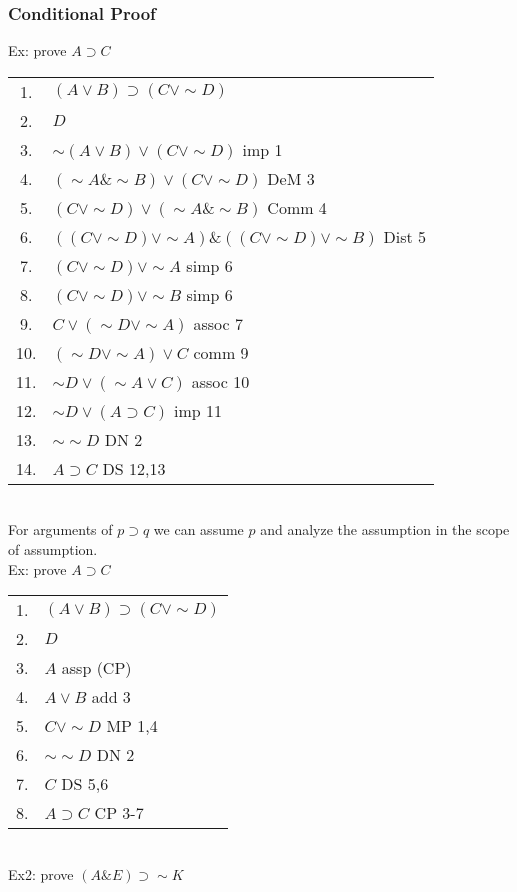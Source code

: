 \subsubsection{Conditional Proof}
Ex: prove $A\supset C$\\
\begin{tabular}{cl}
    1. & $(A\vee B)\supset(C\vee \sim D)$\\
    2. & $D$\\
    \hline
    3. & $\sim(A\vee B)\vee(C\vee \sim D)$ imp 1\\
    4. & $(\sim A\&\sim B)\vee(C\vee \sim D)$ DeM 3\\
    5. & $(C\vee \sim D)\vee(\sim A\&\sim B)$ Comm 4\\
    6. & $((C\vee \sim D)\vee \sim A)\&((C\vee \sim D)\vee \sim B)$ Dist 5\\
    7. & $(C\vee \sim D)\vee \sim A$ simp 6\\
    8. & $(C\vee \sim D)\vee \sim B$ simp 6\\
    9. & $C\vee (\sim D\vee\sim A)$ assoc 7\\
    10. & $(\sim D\vee\sim A)\vee C$ comm 9\\
    11. & $\sim D\vee(\sim A\vee C)$ assoc 10\\
    12. & $\sim D\vee(A\supset C)$ imp 11\\
    13. & $\sim\sim D$ DN 2\\
    14. & $A\supset C$ DS 12,13
\end{tabular}\\
For arguments of $p\supset q$ we can assume $p$ and analyze the assumption in the scope of assumption.\\
Ex: prove $A\supset C$\\
\begin{tabular}{cl}
    1. & $(A\vee B)\supset(C\vee \sim D)$\\
    2. & $D$\\
    \hline
    3. & $A$ assp (CP)\\
    4. & $A\vee B$ add 3\\
    5. & $C\vee\sim D$ MP 1,4\\
    6. & $\sim\sim D$ DN 2\\
    7. & $C$ DS 5,6\\
    8. & $A\supset C$ CP 3-7
\end{tabular}\\
Ex2: prove $(A\& E)\supset \sim K$\\
